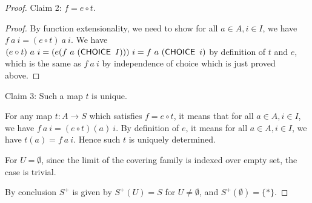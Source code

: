 \documentclass[a4paper]{article}
\DeclareMathOperator{\Sets}{\mathbf {Sets}}
\DeclareMathOperator{\CHOICE}{\sf CHOICE}
\begin{document}
\begin{proof}
    Claim 2: $f=e\circ t$.
    \begin{proof}
        By function extensionality, we need to show for all $a\in A,i\in I$, we have $f \ a \ i = (e\circ t) \ a \ i$. We have $(e\circ t) \ a \ i = (e (f \ a \ (\CHOICE \ I)))\ i = f\ a \ (\CHOICE \ i)$ by definition of $t$ and $e$, which is the same as $f \ a \ i$ by independence of choice which is just proved above.
    \end{proof}
    
    Claim 3: Such a map $t$ is unique. 

    For any map $t:A\to S$ which satisfies $f=e\circ t$, it means that for all $a\in A, i\in I$, we have $f\ a\ i = (e\circ t)(a) \ i$. By definition of $e$, it means for all $a\in A,i\in I$, we have $t(a)=f \ a \ i$. Hence such $t$ is uniquely determined.

    For $U=\emptyset$, since the limit of the covering family is indexed over empty set, the case is trivial.

    By conclusion $S^+$ is given by $S^+(U)= S$ for $U\ne\emptyset$, and $S^+(\emptyset)=\{*\}$.







\end{proof}
\end{document}
